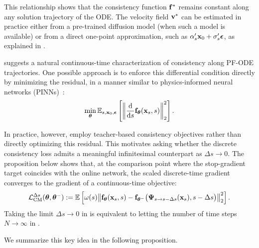 This relationship shows that the consistency function ${\mathbf{f}}^*$ remains constant
along any solution trajectory of the ODE. The velocity field ${\mathbf{v}}^*$ can be
estimated in practice either from a pre-trained diffusion model (when such a
model is available) or from a direct one-point approximation, such as
$\alpha_s' {\mathbf{x}}_0 + \sigma_s' {\bm{\epsilon}}$, as explained in
.  

 suggests a natural continuous-time characterization of consistency along PF-ODE trajectories. One possible approach is to enforce this differential condition directly by minimizing the residual, in a manner similar to physics-informed neural networks (PINNs)~\citep{raissi2018deep,boffi2024flow}:
\begin{align*}
\min_{\bm{\theta}}\mathbb{E}_{s,{\mathbf{x}}_0,\bm{\epsilon}}\left[\left\| \frac{\mathop{}\!\mathrm{d} }{\mathop{}\!\mathrm{d} s} {\mathbf{f}}_{\bm{\theta}}({\mathbf{x}}_s, s) \right\|_2^2\right].
\end{align*}

In practice, however, \citet{song2023consistency,lu2024simplifying} employ teacher-based consistency objectives rather than directly optimizing this residual. This motivates asking whether the discrete consistency loss admits a meaningful infinitesimal counterpart as $\Delta s \to 0$. The proposition below shows that, at the comparison point where the stop-gradient target coincides with the online network, the scaled discrete-time gradient converges to the gradient of a continuous-time objective:
\begin{align}\label{eq:cm-discrete}
\mathcal{L}_{\mathrm{CM}}^{\Delta s}({\bm{\theta}},{\bm{\theta}}^-)
:= \mathbb{E} \left[\omega(s) \big\|
{\mathbf{f}}_{{\bm{\theta}}}({\mathbf{x}}_s,s) -
{\mathbf{f}}_{{\bm{\theta}}^-} \big({\bm{\Psi}}_{s\to s-\Delta s}({\mathbf{x}}_s), s-\Delta s\big)
\big\|_2^2\right].
\end{align}
Taking the limit $\Delta s \to 0$ in
 is equivalent to letting the number of time steps
$N \to \infty$ in
.
 

We summarize this key idea in the following proposition.


